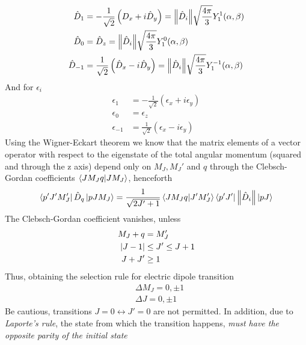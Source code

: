 \documentclass[../qm.tex]{subfiles}
\begin{document}
	\begin{equation}
		\begin{aligned}
			\hat{D}_1&=-\frac{1}{\sqrt{2}}\left( D_x+i\hat{D}_y \right)=\norm{\hat{D}_i}\sqrt{\frac{4\pi}{3}}Y^1_1(\alpha,\beta)\\
			\hat{D}_0&=\hat{D}_z=\norm{\hat{D}_i}\sqrt{\frac{4\pi}{3}}Y^0_1(\alpha,\beta)\\
			\hat{D}_{-1}&=\frac{1}{\sqrt{2}}\left( \hat{D}_x-i\hat{D}_y \right)=\norm{\hat{D}_i}\sqrt{\frac{4\pi}{3}}Y^{-1}_1(\alpha,\beta)
		\end{aligned}
		\label{eq:doprsphcomp}
	\end{equation}
	And for $\epsilon_i$
	\begin{equation}
		\begin{aligned}
			\epsilon_1&=-\frac{1}{\sqrt{2}}\left( \epsilon_x+i\epsilon_y \right)\\
			\epsilon_0&= \epsilon_z\\
			\epsilon_{-1}&= \frac{1}{\sqrt{2}}\left( \epsilon_x-i\epsilon_y \right)
		\end{aligned}
		\label{eq:polversphcomp}
	\end{equation}
	Using the Wigner-Eckart theorem we know that the matrix elements of a vector operator with respect to the eigenstate of the total angular momentum (squared and through the z axis) depend only on $M_J,M_J'$ and $q$ through the Clebsch-Gordan coefficients $\bra{JM_Jq}\ket{JM_J}$, henceforth
	\begin{equation}
		\bra{p'J'M_J'}\hat{D}_q\ket{pJM_J}=\frac{1}{\sqrt{2J'+1}}\bra{JM_Jq}\ket{J'M_J'}\bra{p'J'}\norm{\hat{D}_i}\ket{pJ}
		\label{eq:selecrulej}
	\end{equation}
	The Clebsch-Gordan coefficient vanishes, unless
	\begin{equation}
		\begin{aligned}
			M_J+q&=M_J'\\
			\abs{J-1}&\le J'\le J+1\\
			J+J'&\ge1
		\end{aligned}
		\label{eq:nonzerocgcoeff}
	\end{equation}
	Thus, obtaining the selection rule for electric dipole transition
	\begin{equation}
		\begin{aligned}
			&\boxed{\boxed{\Delta M_J=0,\pm1}}\\
			&\boxed{\boxed{\Delta J=0,\pm1}}
		\end{aligned}
		\label{eq:selectionrulemj}
	\end{equation}
	Be cautious, transitions $J=0\leftrightarrow J'=0$ are not permitted. In addition, due to \textit{Laporte's rule}, the state from which the transition happens, \emph{must have the opposite parity of the initial state}
\end{document}
